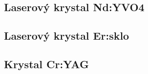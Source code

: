 	\subsection{Laserový krystal Nd:YVO4}
	
	
	\subsection{Laserový krystal Er:sklo}
	
	
	\subsection{Krystal Cr:YAG}
				
			

			



